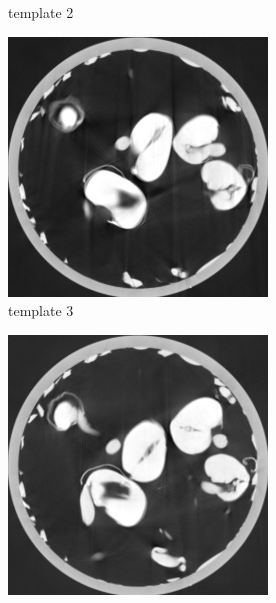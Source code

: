 \documentclass{article}
\begin{document}
\begin{figure}[h]
\begin{subfigure}[b]{0.3\linewidth}
        \caption{template 2}
     \end{subfigure}
    \begin{subfigure}[b]{0.3\linewidth}
        \includegraphics[width=\textwidth]{../images/supplementary/2D_sprouts/template3.png}
        \caption{template 3}
     \end{subfigure}
    \begin{subfigure}[b]{0.3\linewidth}
        \includegraphics[width=\textwidth]{../images/supplementary/2D_sprouts/template4.png}

\end{subfigure}
\end{figure}
\end{document}
